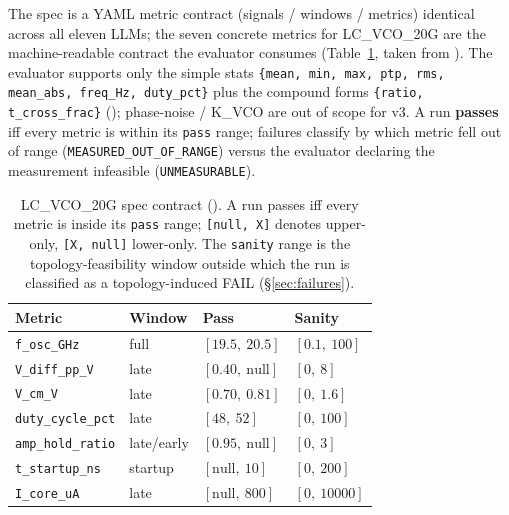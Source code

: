 The spec is a YAML metric contract (signals / windows / metrics)
identical across all eleven LLMs; the seven concrete metrics for
LC\_VCO\_20G are the machine-readable contract the evaluator
consumes (Table~\ref{tab:spec}, taken from
). The evaluator supports only the simple
stats \texttt{\{mean, min, max, ptp, rms, mean\_abs, freq\_Hz,
duty\_pct\}} plus the compound forms
\texttt{\{ratio, t\_cross\_frac\}}
(); phase-noise / K\_VCO
are out of scope for v3. A run \textbf{passes} iff every metric is
within its \texttt{pass} range; failures classify by which metric
fell out of range (\texttt{MEASURED\_OUT\_OF\_RANGE}) versus the
evaluator declaring the measurement infeasible
(\texttt{UNMEASURABLE}).

\begin{table}[t]
  \centering
  \caption{LC\_VCO\_20G spec contract ().
    A run passes iff every metric is inside its \texttt{pass}
    range; \texttt{[null,\ X]} denotes upper-only,
    \texttt{[X,\ null]} lower-only. The \texttt{sanity} range is
    the topology-feasibility window outside which the run is
    classified as a topology-induced FAIL (\S\ref{sec:failures}).}
  \label{tab:spec}
  \footnotesize
  \setlength{\tabcolsep}{3.5pt}
  \begin{tabular}{l l l l}
    \toprule
    \textbf{Metric} & \textbf{Window} & \textbf{Pass} & \textbf{Sanity} \\
    \midrule
    \texttt{f\_osc\_GHz}      & full         & $[19.5,\ 20.5]$    & $[0.1,\ 100]$ \\
    \texttt{V\_diff\_pp\_V}   & late         & $[0.40,\ \text{null}]$ & $[0,\ 8]$ \\
    \texttt{V\_cm\_V}         & late         & $[0.70,\ 0.81]$    & $[0,\ 1.6]$ \\
    \texttt{duty\_cycle\_pct} & late         & $[48,\ 52]$        & $[0,\ 100]$ \\
    \texttt{amp\_hold\_ratio} & late/early   & $[0.95,\ \text{null}]$ & $[0,\ 3]$ \\
    \texttt{t\_startup\_ns}   & startup      & $[\text{null},\ 10]$ & $[0,\ 200]$ \\
    \texttt{I\_core\_uA}      & late         & $[\text{null},\ 800]$ & $[0,\ 10000]$ \\
    \bottomrule
  \end{tabular}
\end{table}

